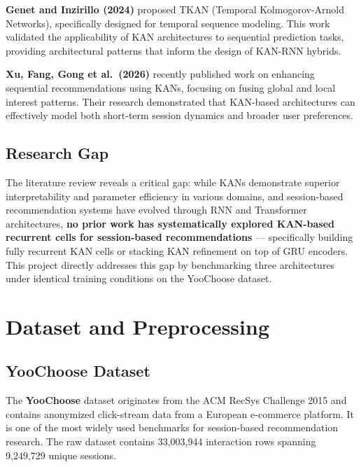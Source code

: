 \documentclass[12pt,a4paper]{report}
\begin{document}
\textbf{Genet and Inzirillo (2024)} \cite{genet2024} proposed TKAN (Temporal
Kolmogorov-Arnold Networks), specifically designed for temporal sequence modeling.
This work validated the applicability of KAN architectures to sequential
prediction tasks, providing architectural patterns that inform the design of
KAN-RNN hybrids.

\textbf{Xu, Fang, Gong et al.\ (2026)} \cite{xu2026} recently published work on
enhancing sequential recommendations using KANs, focusing on fusing global and
local interest patterns. Their research demonstrated that KAN-based architectures
can effectively model both short-term session dynamics and broader user
preferences.

\section{Research Gap}

The literature review reveals a critical gap: while KANs demonstrate superior
interpretability and parameter efficiency in various domains, and session-based
recommendation systems have evolved through RNN and Transformer architectures,
\textbf{no prior work has systematically explored KAN-based recurrent cells for
session-based recommendations} --- specifically building fully recurrent KAN cells
or stacking KAN refinement on top of GRU encoders. This project directly addresses
this gap by benchmarking three architectures under identical training conditions
on the YooChoose dataset.

\chapter{Dataset and Preprocessing}

\section{YooChoose Dataset}

The \textbf{YooChoose} dataset originates from the ACM RecSys Challenge 2015 and
contains anonymized click-stream data from a European e-commerce platform. It is
one of the most widely used benchmarks for session-based recommendation research.
The raw dataset contains 33,003,944 interaction rows spanning 9,249,729 unique
sessions.
\end{document}
